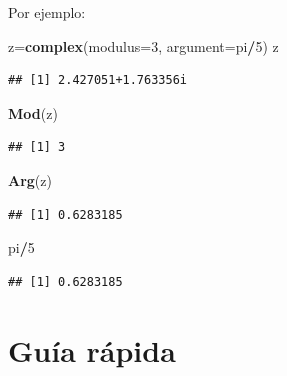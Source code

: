 \documentclass[]{book}
\newenvironment{Shaded}{\begin{snugshade}}{\end{snugshade}}
\newcommand{\DataTypeTok}[1]{\textcolor[rgb]{0.13,0.29,0.53}{#1}}
\newcommand{\DecValTok}[1]{\textcolor[rgb]{0.00,0.00,0.81}{#1}}
\newcommand{\KeywordTok}[1]{\textcolor[rgb]{0.13,0.29,0.53}{\textbf{#1}}}
\newcommand{\NormalTok}[1]{#1}
\newcommand{\OperatorTok}[1]{\textcolor[rgb]{0.81,0.36,0.00}{\textbf{#1}}}
\theoremstyle{definition}
\theoremstyle{definition}
\theoremstyle{definition}
\theoremstyle{remark}
\begin{document}
Por ejemplo:

\begin{Shaded}
\begin{Highlighting}[]
\NormalTok{z=}\KeywordTok{complex}\NormalTok{(}\DataTypeTok{modulus=}\DecValTok{3}\NormalTok{, }\DataTypeTok{argument=}\NormalTok{pi}\OperatorTok{/}\DecValTok{5}\NormalTok{)}
\NormalTok{z}
\end{Highlighting}
\end{Shaded}

\begin{verbatim}
## [1] 2.427051+1.763356i
\end{verbatim}

\begin{Shaded}
\begin{Highlighting}[]
\KeywordTok{Mod}\NormalTok{(z)}
\end{Highlighting}
\end{Shaded}

\begin{verbatim}
## [1] 3
\end{verbatim}

\begin{Shaded}
\begin{Highlighting}[]
\KeywordTok{Arg}\NormalTok{(z)}
\end{Highlighting}
\end{Shaded}

\begin{verbatim}
## [1] 0.6283185
\end{verbatim}

\begin{Shaded}
\begin{Highlighting}[]
\NormalTok{pi}\OperatorTok{/}\DecValTok{5}
\end{Highlighting}
\end{Shaded}

\begin{verbatim}
## [1] 0.6283185
\end{verbatim}

\hypertarget{guia-rapida-1}{%
\section{Guía rápida}\label{guia-rapida-1}}
\end{document}

